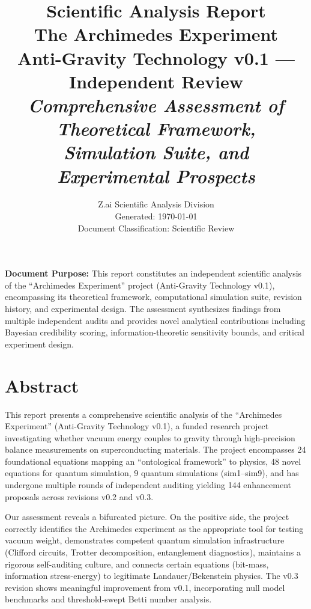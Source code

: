 \documentclass[11pt,a4paper]{article}
\title{
  \vspace{-1.5cm}
  {\LARGE\bfseries Scientific Analysis Report}\\[0.4cm]
  {\Large\textcolor{infoblue}{The Archimedes Experiment}}\\[0.2cm]
  {\large Anti-Gravity Technology v0.1 --- Independent Review}\\[0.8cm]
  {\large\textit{Comprehensive Assessment of Theoretical Framework,\\
  Simulation Suite, and Experimental Prospects}}
}
\author{
  Z.ai Scientific Analysis Division\\[0.3cm]
  \small Generated: \today\\
  \small Document Classification: Scientific Review
}
\date{}
\begin{document}

\maketitle
\thispagestyle{empty}

\begin{center}
\begin{tcolorbox}[colback=boxbg, colframe=infoblue!60!black, width=0.9\textwidth, boxrule=0.6pt]
\centering
\textbf{Document Purpose:} This report constitutes an independent scientific analysis of the ``Archimedes Experiment'' project (Anti-Gravity Technology v0.1), encompassing its theoretical framework, computational simulation suite, revision history, and experimental design. The assessment synthesizes findings from multiple independent audits and provides novel analytical contributions including Bayesian credibility scoring, information-theoretic sensitivity bounds, and critical experiment design.
\end{tcolorbox}
\end{center}

\newpage
\tableofcontents
\newpage

\section*{Abstract}

This report presents a comprehensive scientific analysis of the ``Archimedes Experiment'' (Anti-Gravity Technology v0.1), a funded research project investigating whether vacuum energy couples to gravity through high-precision balance measurements on superconducting materials. The project encompasses 24 foundational equations mapping an ``ontological framework'' to physics, 48 novel equations for quantum simulation, 9 quantum simulations (sim1--sim9), and has undergone multiple rounds of independent auditing yielding 144 enhancement proposals across revisions v0.2 and v0.3.

Our assessment reveals a bifurcated picture. On the positive side, the project correctly identifies the Archimedes experiment as the appropriate tool for testing vacuum weight, demonstrates competent quantum simulation infrastructure (Clifford circuits, Trotter decomposition, entanglement diagnostics), maintains a rigorous self-auditing culture, and connects certain equations (bit-mass, information stress-energy) to legitimate Landauer/Bekenstein physics. The v0.3 revision shows meaningful improvement from v0.1, incorporating null model benchmarks and threshold-swept Betti number analysis.
\end{document}
